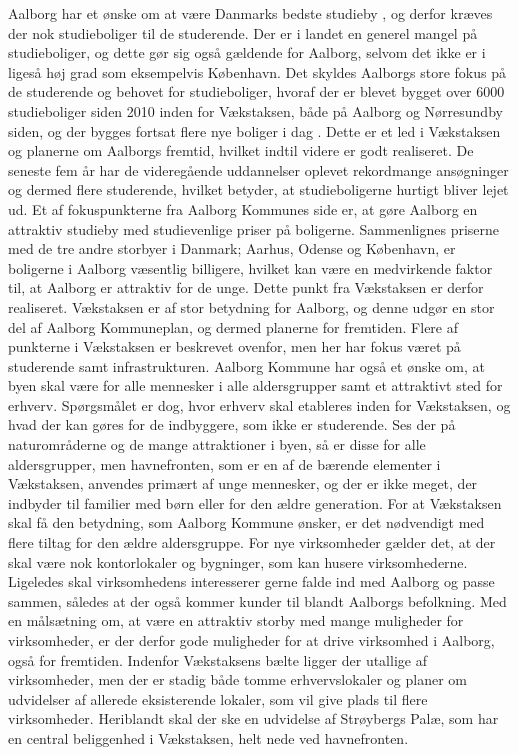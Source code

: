 \newline
\newline
Aalborg har et ønske om at være Danmarks bedste studieby \citep{ungdom}, og derfor kræves der nok studieboliger til de studerende. Der er i landet en generel mangel på studieboliger, og dette gør sig også gældende for Aalborg, selvom det ikke er i ligeså høj grad som eksempelvis København. Det skyldes Aalborgs store fokus på de studerende og behovet for studieboliger, hvoraf der er blevet bygget over 6000 studieboliger siden 2010 inden for Vækstaksen, både på Aalborg og Nørresundby siden, og der bygges fortsat flere nye boliger i dag \citep{studieboliger}. Dette er et led i Vækstaksen og planerne om Aalborgs fremtid, hvilket indtil videre er godt realiseret. De seneste fem år har de videregående uddannelser oplevet rekordmange ansøgninger og dermed flere studerende, hvilket betyder, at studieboligerne hurtigt bliver lejet ud. Et af fokuspunkterne fra Aalborg Kommunes side er, at gøre Aalborg en attraktiv studieby med studievenlige priser på boligerne. Sammenlignes priserne med de tre andre storbyer i Danmark; Aarhus, Odense og København, er boligerne i Aalborg væsentlig billigere, hvilket kan være en medvirkende faktor til, at Aalborg er attraktiv for de unge. Dette punkt fra Vækstaksen er derfor realiseret.
\newline
\newline
Vækstaksen er af stor betydning for Aalborg, og denne udgør en stor del af Aalborg Kommuneplan, og dermed planerne for fremtiden. Flere af punkterne i Vækstaksen er beskrevet ovenfor, men her har fokus været på studerende samt infrastrukturen. Aalborg Kommune har også et ønske om, at byen skal være for alle mennesker i alle aldersgrupper samt et attraktivt sted for erhverv. Spørgsmålet er dog, hvor erhverv skal etableres inden for Vækstaksen, og hvad der kan gøres for de indbyggere, som ikke er studerende. Ses der på naturområderne og de mange attraktioner i byen, så er disse for alle aldersgrupper, men havnefronten, som er en af de bærende elementer i Vækstaksen, anvendes primært af unge mennesker, og der er ikke meget, der indbyder til familier med børn eller for den ældre generation. For at Vækstaksen skal få den betydning, som Aalborg Kommune ønsker, er det nødvendigt med flere tiltag for den ældre aldersgruppe. 
\newline \indent{     }  For nye virksomheder gælder det, at der skal være nok kontorlokaler og bygninger, som kan husere virksomhederne. Ligeledes skal virksomhedens interesserer gerne falde ind med Aalborg og passe sammen, således at der også kommer kunder til blandt Aalborgs befolkning. Med en målsætning om, at være en attraktiv storby med mange muligheder for virksomheder, er der derfor gode muligheder for at drive virksomhed i Aalborg, også for fremtiden. Indenfor Vækstaksens bælte ligger der utallige af virksomheder, men der er stadig både tomme erhvervslokaler og planer om udvidelser af allerede eksisterende lokaler, som vil give plads til flere virksomheder. Heriblandt skal der ske en udvidelse af Strøybergs Palæ, som har en central beliggenhed i Vækstaksen, helt nede ved havnefronten. 

